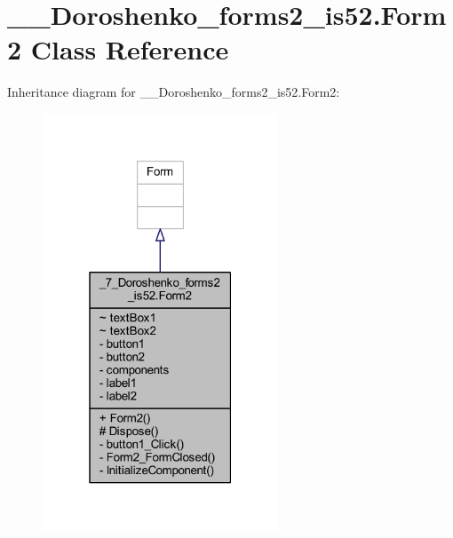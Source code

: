 \hypertarget{class__7___doroshenko__forms2__is52_1_1_form2}{}\section{\+\_\+\_\+\+Doroshenko\+\_\+forms2\+\_\+is52.\+Form2 Class Reference}
\label{class__7___doroshenko__forms2__is52_1_1_form2}


Inheritance diagram for \+\_\+\_\+\+Doroshenko\+\_\+forms2\+\_\+is52.\+Form2\+:
\nopagebreak
\begin{figure}[H]
\begin{center}
\leavevmode
\includegraphics[width=199pt]{class__7___doroshenko__forms2__is52_1_1_form2__inherit__graph}
\end{center}
\end{figure}


